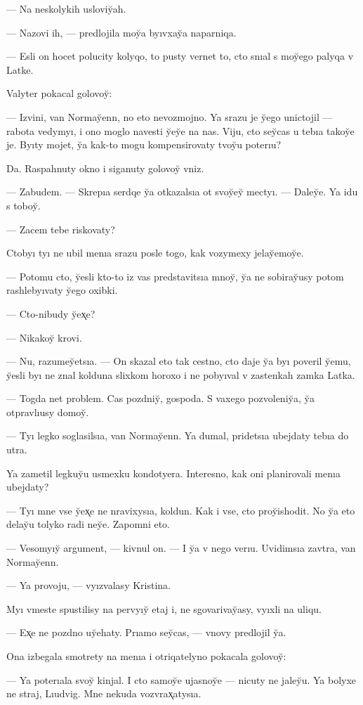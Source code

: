 \documentclass[10pt]{book}
\begin{document}
— Na neskolykih usloviy̆ah.

— Nazovi ih, — predlojila moy̆a byıvxay̆a naparniqa.

— Esli on hocet polucity kolyqo, to pusty vernet to, cto snıal s moy̆ego palyqa v Latke.

Valyter pokacal golovoy̆:

— Izvini, van Normay̆enn, no eto nevozmojno. Ya srazu je y̆ego unictojil — rabota vedymyı, i ono moglo navesti y̆ey̆e na nas. Viju, cto sey̆cas u tebıa takoy̆e je. Byıty mojet, y̆a kak-to mogu kompensirovaty tvoy̆u poterıu?

Da. Raspahnuty okno i siganuty golovoy̆ vniz.

— Zabudem. — Skrepıa serdqe y̆a otkazalsıa ot svoy̆ey̆ mectyı. — Daley̆e. Ya idu s toboy̆.

— Zacem tebe riskovaty?

Ctobyı tyı ne ubil menıa srazu posle togo, kak vozymexy jelay̆emoy̆e.

— Potomu cto, y̆esli kto-to iz vas predstavitsıa mnoy̆, y̆a ne sobiray̆usy potom rashlebyıvaty y̆ego oxibki.

— Cto-nibudy y̆ex̨e?

— Nikakoy̆ krovi.

— Nu, razumey̆etsıa. — On skazal eto tak cestno, cto daje y̆a byı poveril y̆emu, y̆esli byı ne znal kolduna slixkom horoxo i ne pobyıval v zastenkah zamka Latka.

— Togda net problem. Cas pozdniy̆, gospoda. S vaxego pozvoleniy̆a, y̆a otpravlıusy domoy̆.

— Tyı legko soglasilsıa, van Normay̆enn. Ya dumal, pridetsıa ubejdaty tebıa do utra.

Ya zametil legkuy̆u usmexku kondotyera. Interesno, kak oni planirovali menıa ubejdaty?

— Tyı mne vse y̆ex̨e ne nravixysıa, koldun. Kak i vse, cto proy̆ishodit. No y̆a eto delay̆u tolyko radi ney̆e. Zapomni eto.

— Vesomyıy̆ argument, — kivnul on. — I y̆a v nego verıu. Uvidimsıa zavtra, van Normay̆enn.

— Ya provoju, — vyızvalasy Kristina.

Myı vmeste spustilisy na pervyıy̆ etaj i, ne sgovarivay̆asy, vyıxli na uliqu.

— Ex̨e ne pozdno uy̆ehaty. Prıamo sey̆cas, — vnovy predlojil y̆a.

Ona izbegala smotrety na menıa i otriqatelyno pokacala golovoy̆:

— Ya poterıala svoy̆ kinjal. I cto samoy̆e ujasnoy̆e — nicuty ne jaley̆u. Ya bolyxe ne straj, Lıudvig. Mne nekuda vozvrax̨atysıa.
\end{document}
